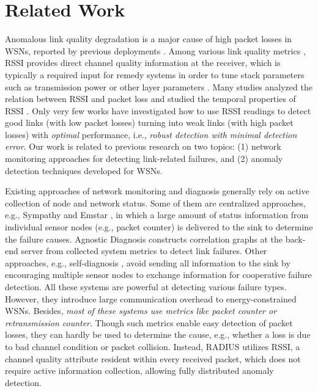 \section{Related Work}\label{sec:related}

Anomalous link quality degradation is 
a major cause of high packet losses in WSNs, reported by previous deployments \cite{6850017, 4408504, 6661323, 1182885}. Among various link quality metrics \cite{2240123}, RSSI provides direct channel quality information at the receiver, which is typically a required input for remedy systems in order to tune stack parameters such as transmission power \cite{Lin:atpc} or other layer parameters \cite{2185730,7164923}. Many studies \cite{levis2006rssi, 7164923} analyzed the relation between RSSI and packet loss and studied the temporal properties of RSSI \cite{2893729}. Only very few works have investigated how to use RSSI readings to detect good links (with low packet losses) turning into weak links (with high packet losses) with \textit{optimal} performance, i.e., \textit{robust detection with minimal detection error}. Our work is related to previous research on two topics: (1) network monitoring approaches for detecting link-related failures, and (2) anomaly detection techniques developed for WSNs. 

Existing approaches of network monitoring and diagnosis generally rely on active collection of node and network status. Some of them are centralized approaches, e.g., Sympathy \cite{1367278} and Emstar \cite{1267061}, in which a large amount of status information from individual sensor nodes (e.g., packet counter) is delivered to the sink to determine the failure causes. Agnostic Diagnosis \cite{6661323} constructs correlation graphs at the back-end server from collected system metrics to detect link failures. Other approaches, e.g., self-diagnosis \cite{6850017}, avoid sending all information to the sink by encouraging multiple sensor nodes to exchange information for cooperative failure detection. All these systems are powerful at detecting various failure types. However, they introduce large communication overhead to energy-constrained WSNs. Besides, \textit{most of these systems use metrics like packet counter or retransmission counter}. Though such metrics enable easy detection of packet losses, they can hardly be used to determine the cause, e.g., whether a loss is due to bad channel condition or packet collision. Instead, RADIUS utilizes RSSI, a channel quality attribute resident within every received packet, which does not require active information collection, allowing fully distributed anomaly detection. 

